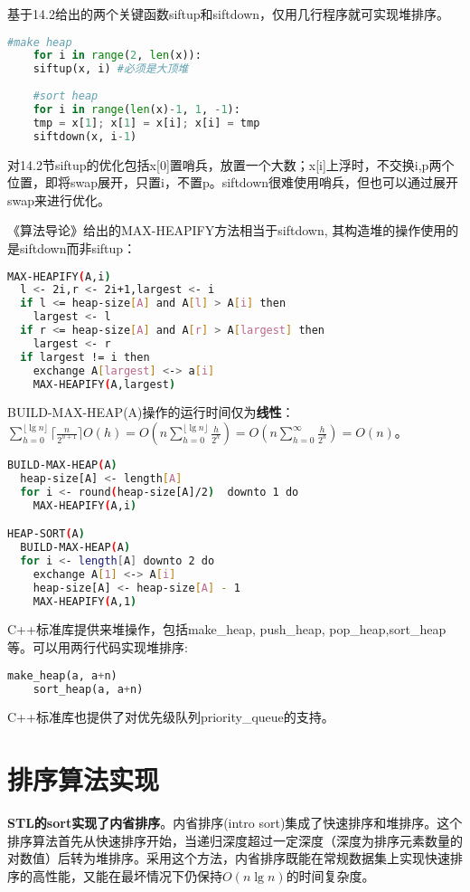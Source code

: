 基于\cite{pp}14.2给出的两个关键函数siftup和siftdown，仅用几行程序就可实现堆排序。
\begin{lstlisting}[language=Python]
    #make heap
    for i in range(2, len(x)):
	siftup(x, i) #必须是大顶堆
    
    #sort heap
    for i in range(len(x)-1, 1, -1):
	tmp = x[1]; x[1] = x[i]; x[i] = tmp
	siftdown(x, i-1)
\end{lstlisting}
对\cite{pp}14.2节siftup的优化包括x[0]置哨兵，放置一个大数；x[i]上浮时，不交换i,p两个位置，即将swap展开，只置i，不置p。siftdown很难使用哨兵，但也可以通过展开swap来进行优化。

《算法导论》给出的MAX-HEAPIFY方法相当于siftdown, 其构造堆的操作使用的是siftdown而非siftup：
\begin{lstlisting}[language=bash]
MAX-HEAPIFY(A,i)
  l <- 2i,r <- 2i+1,largest <- i
  if l <= heap-size[A] and A[l] > A[i] then
    largest <- l
  if r <= heap-size[A] and A[r] > A[largest] then
    largest <- r
  if largest != i then
    exchange A[largest] <-> a[i]
    MAX-HEAPIFY(A,largest)
\end{lstlisting}

BUILD-MAX-HEAP(A)操作的运行时间仅为\textbf{线性}：
$\sum \limits_{h=0} ^{\lfloor \lg n \rfloor} \lceil \frac{n}{2^{h+1}} \rceil O(h) = O(n \sum \limits_{h=0} ^{\lfloor \lg n \rfloor} \frac{h}{2^h}) = O(n \sum \limits_{h=0} ^{\infty} \frac{h}{2^h}) = O(n)$。
\begin{lstlisting}[language=bash]
BUILD-MAX-HEAP(A)
  heap-size[A] <- length[A]
  for i <- round(heap-size[A]/2)  downto 1 do
    MAX-HEAPIFY(A,i)

HEAP-SORT(A)
  BUILD-MAX-HEAP(A)
  for i <- length[A] downto 2 do
    exchange A[1] <-> A[i]
    heap-size[A] <- heap-size[A] - 1
    MAX-HEAPIFY(A,1)
\end{lstlisting}

C++标准库提供来堆操作，包括make\_heap, push\_heap, pop\_heap,sort\_heap等。可以用两行代码实现堆排序:
\begin{lstlisting}[language=Python]
    make_heap(a, a+n)
    sort_heap(a, a+n)
\end{lstlisting}

C++标准库也提供了对优先级队列priority\_queue的支持。

\section{排序算法实现}
\textbf{STL的sort实现了内省排序}。内省排序(intro sort)集成了快速排序和堆排序。这个排序算法首先从快速排序开始，当递归深度超过一定深度（深度为排序元素数量的对数值）后转为堆排序。采用这个方法，内省排序既能在常规数据集上实现快速排序的高性能，又能在最坏情况下仍保持$O(n\lg n)$的时间复杂度。

